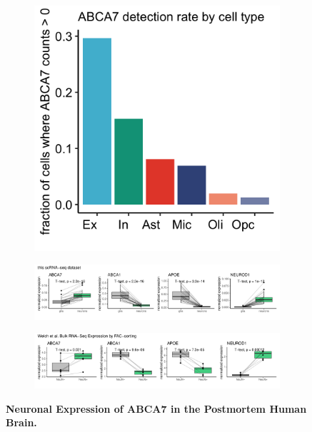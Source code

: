 \begin{figure}[H]
    \begin{subfigure}[t]{.25\textwidth}
        \caption{}
        \includegraphics[width=\textwidth]{./extended_plots/abca7_detection_rate.png}        
    \end{subfigure}
    \par
    \begin{subfigure}[t]{\textwidth}
        \caption{}
        \includegraphics[width=\textwidth]{./extended_plots/scRNAseq_bulk_rna.pdf}        
    \end{subfigure}
    \par
    \begin{subfigure}[t]{\textwidth}
        \caption{}
        \includegraphics[width=\textwidth]{./extended_plots/welch_et_al_bulk_rna.pdf}        
    \end{subfigure}
    \caption{
        \textbf{Neuronal Expression of ABCA7 in the Postmortem Human Brain.}\\
    }
    \label{fig:abca7_expression}
\end{figure}
